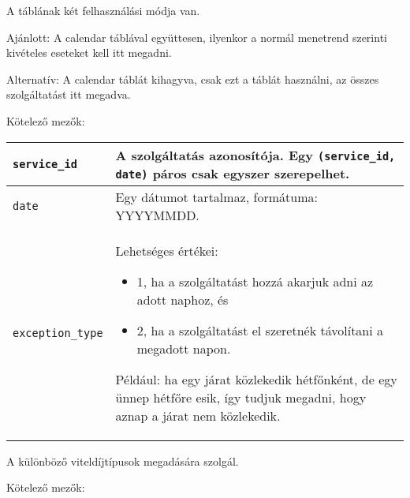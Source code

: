 
A táblának két felhasználási módja van.

Ajánlott: A calendar táblával együttesen, ilyenkor a normál menetrend szerinti kivételes eseteket kell itt megadni.

Alternatív: A calendar táblát kihagyva, csak ezt a táblát használni, az összes szolgáltatást itt megadva. 

\medskip

\noindent Kötelező mezők:

\bigskip

\begin{tabular}{|p{3.5cm}|p{10cm}|}
\hline
\texttt{service\_id} & A szolgáltatás azonosítója. Egy \texttt{(service\_id, date)} páros csak egyszer szerepelhet. \\
\hline
\texttt{date} & Egy dátumot tartalmaz, formátuma: YYYYMMDD. \\
\hline
\texttt{exception\_type} & Lehetséges értékei:
\begin{itemize}
\item 1, ha a szolgáltatást hozzá akarjuk adni az adott naphoz, és
\item 2, ha a szolgáltatást el szeretnék távolítani a megadott napon.
\end{itemize}
Például: ha egy járat közlekedik hétfőnként, de egy ünnep hétfőre esik, így tudjuk megadni, hogy aznap a járat nem közlekedik. \\
\hline
\end{tabular}

\newpage


A különböző viteldíjtípusok megadására szolgál.

\medskip

\noindent Kötelező mezők:

\bigskip

